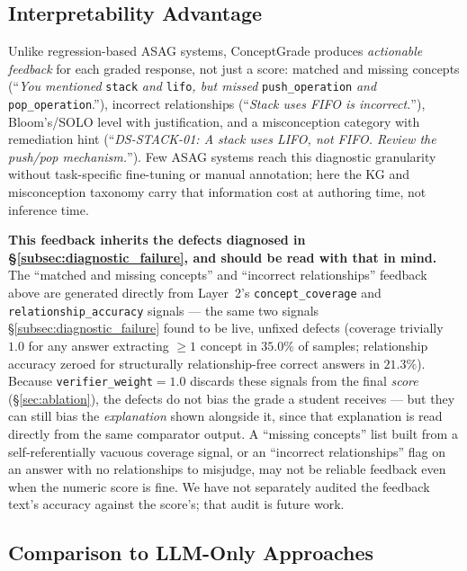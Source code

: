 \documentclass[conference]{IEEEtran}
\begin{document}
\subsection{Interpretability Advantage}

Unlike regression-based ASAG systems, ConceptGrade produces \emph{actionable
feedback} for each graded response, not just a score: matched and missing
concepts (``\textit{You mentioned} \texttt{stack} \textit{and}
\texttt{lifo}\textit{, but missed} \texttt{push\_operation}\textit{ and }
\texttt{pop\_operation}.''), incorrect relationships (``\textit{Stack uses
FIFO is incorrect.}''), Bloom's/SOLO level with justification, and a
misconception category with remediation hint (``\textit{DS-STACK-01: A
stack uses LIFO, not FIFO. Review the push/pop mechanism.}''). Few ASAG
systems reach this diagnostic granularity without task-specific
fine-tuning or manual annotation; here the KG and misconception taxonomy
carry that information cost at authoring time, not inference time.

\textbf{This feedback inherits the defects diagnosed in
\S\ref{subsec:diagnostic_failure}, and should be read with that in
mind.} The ``matched and missing concepts'' and ``incorrect
relationships'' feedback above are generated directly from Layer~2's
\texttt{concept\_coverage} and \texttt{relationship\_accuracy}
signals --- the same two signals \S\ref{subsec:diagnostic_failure}
found to be live, unfixed defects (coverage trivially $1.0$ for any
answer extracting $\geq 1$ concept in $35.0\%$ of samples;
relationship accuracy zeroed for structurally relationship-free
correct answers in $21.3\%$). Because \texttt{verifier\_weight}$=1.0$
discards these signals from the final \emph{score}
(\S\ref{sec:ablation}), the defects do not bias the grade a student
receives --- but they can still bias the \emph{explanation} shown
alongside it, since that explanation is read directly from the same
comparator output. A ``missing concepts'' list built from a
self-referentially vacuous coverage signal, or an ``incorrect
relationships'' flag on an answer with no relationships to
misjudge, may not be reliable feedback even when the numeric score
is fine. We have not separately audited the feedback text's accuracy
against the score's; that audit is future work.

\subsection{Comparison to LLM-Only Approaches}
\end{document}
